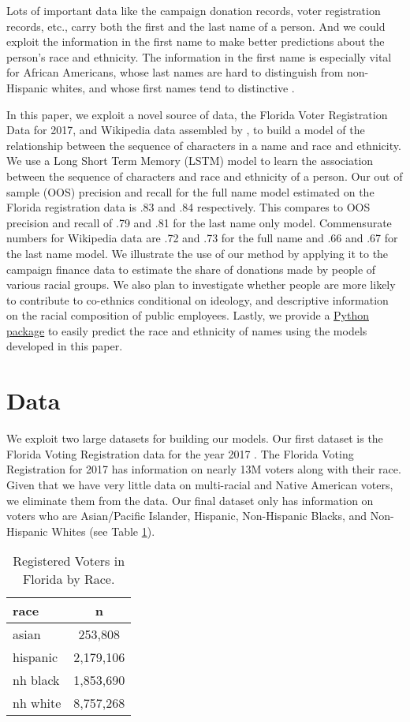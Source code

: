 \documentclass[12pt, letterpaper]{article}
\begin{document}
Lots of important data like the campaign donation records, voter registration records, etc., carry both the first and the last name of a person. And we could exploit the information in the first name to make better predictions about the person's race and ethnicity. The information in the first name is especially vital for African Americans, whose last names are hard to distinguish from non-Hispanic whites, and whose first names tend to distinctive \citep{bertrand2004emily}. 

In this paper, we exploit a novel source of data, the Florida Voter Registration Data for 2017, and Wikipedia data assembled by \citet{ambekar2009name}, to build a model of the relationship between the sequence of characters in a name and race and ethnicity. We use a Long Short Term Memory (LSTM) model \citep{graves2005framewise} to learn the association between the sequence of characters and race and ethnicity of a person. Our out of sample (OOS) precision and recall for the full name model estimated on the Florida registration data is .83 and .84 respectively. This compares to OOS precision and recall of .79 and .81 for the last name only model. Commensurate numbers for Wikipedia data are .72 and .73 for the full name and .66 and .67 for the last name model. We illustrate the use of our method by applying it to the campaign finance data to estimate the share of donations made by people of various racial groups. We also plan to investigate whether people are more likely to contribute to co-ethnics conditional on ideology, and descriptive information on the racial composition of public employees. Lastly, we provide a \href{http://github.com/appeler/ethnicolr}{Python package} to easily predict the race and ethnicity of names using the models developed in this paper.

\section*{Data}
We exploit two large datasets for building our models. Our first dataset is the Florida Voting Registration data for the year 2017 \citep{sood_2017}. The Florida Voting Registration for 2017 has information on nearly 13M voters along with their race. Given that we have very little data on multi-racial and Native American voters, we eliminate them from the data. Our final dataset only has information on voters who are Asian/Pacific Islander, Hispanic, Non-Hispanic Blacks, and Non-Hispanic Whites (see Table \ref{table:fl_data}). 

\begin{table}[h!]
\centering
\caption{Registered Voters in Florida by Race.}
\begin{tabular}{ l c }
\hline    
race & n \\
\hline
asian & 253,808 \\
hispanic & 2,179,106 \\
nh black & 1,853,690 \\
nh white & 8,757,268 \\
\hline
\end{tabular}
\label{table:fl_data}
\end{table}
\end{document}
